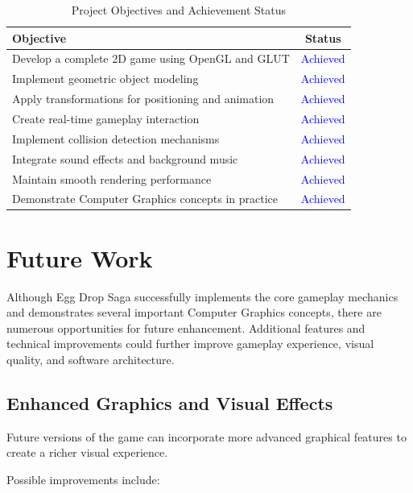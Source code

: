 \documentclass[12pt,a4paper]{report}
\begin{document}
\begin{table}[H]
\centering

\begin{tabular}{|p{9cm}|c|}
\hline
\textbf{Objective} & \textbf{Status} \\
\hline
Develop a complete 2D game using OpenGL and GLUT & \textcolor{blue}{Achieved} \\
\hline
Implement geometric object modeling & \textcolor{blue}{Achieved} \\
\hline
Apply transformations for positioning and animation & \textcolor{blue}{Achieved} \\
\hline
Create real-time gameplay interaction & \textcolor{blue}{Achieved} \\
\hline
Implement collision detection mechanisms & \textcolor{blue}{Achieved} \\
\hline
Integrate sound effects and background music & \textcolor{blue}{Achieved} \\
\hline
Maintain smooth rendering performance & \textcolor{blue}{Achieved} \\
\hline
Demonstrate Computer Graphics concepts in practice & \textcolor{blue}{Achieved} \\
\hline
\end{tabular}
\caption{Project Objectives and Achievement Status}
\end{table}






\chapter{Future Work}


Although Egg Drop Saga successfully implements the core gameplay mechanics and demonstrates several important Computer Graphics concepts, there are numerous opportunities for future enhancement. Additional features and technical improvements could further improve gameplay experience, visual quality, and software architecture.

\section{Enhanced Graphics and Visual Effects}

Future versions of the game can incorporate more advanced graphical features to create a richer visual experience.

Possible improvements include:
\end{document}
